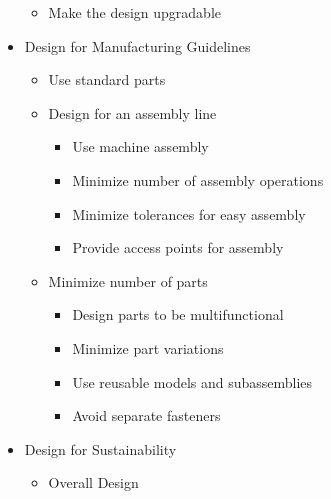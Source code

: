 \begin{itemize}
\begin{itemize}
      \item Make the design upgradable

    \end{itemize}

  \item Design for Manufacturing Guidelines

    \begin{itemize}

      \item Use standard parts

      \item Design for an assembly line

        \begin{itemize}

          \item Use machine assembly

          \item Minimize number of assembly operations

          \item Minimize tolerances for easy assembly

          \item Provide access points for assembly 

        \end{itemize}

      \item Minimize number of parts

        \begin{itemize}

          \item Design parts to be multifunctional

          \item Minimize part variations

          \item Use reusable models and subassemblies

          \item Avoid separate fasteners

        \end{itemize}

    \end{itemize}

  \item Design for Sustainability

    \begin{itemize}

      \item Overall Design


\end{itemize}
\end{itemize}
